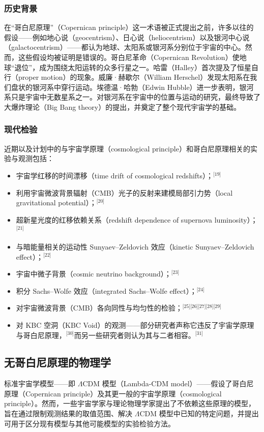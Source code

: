 \subsubsection{历史背景}
在“哥白尼原理”（Copernican principle）这一术语被正式提出之前，许多以往的假设——例如地心说（geocentrism）、日心说（heliocentrism）以及银河中心说（galactocentrism）——都认为地球、太阳系或银河系分别位于宇宙的中心。然而，这些假设均被证明是错误的。哥白尼革命（Copernican Revolution）使地球“退位”，成为围绕太阳运转的众多行星之一。哈雷（Halley）首次提及了恒星自行（proper motion）的现象。威廉·赫歇尔（William Herschel）发现太阳系在我们盘状的银河系中穿行运动。埃德温·哈勃（Edwin Hubble）进一步表明，银河系只是宇宙中无数星系之一。对银河系在宇宙中的位置与运动的研究，最终导致了大爆炸理论（Big Bang theory）的提出，并奠定了整个现代宇宙学的基础。
\subsubsection{现代检验}
近期以及计划中的与宇宙学原理（cosmological principle）和哥白尼原理相关的实验与观测包括：
\begin{itemize}
    \item 宇宙学红移的时间漂移（time drift of cosmological redshifts）；\(^\text{[19]}\)
    \item 利用宇宙微波背景辐射（CMB）光子的反射来建模局部引力势（local gravitational potential）；\(^\text{[20]}\)
    \item 超新星光度的红移依赖关系（redshift dependence of supernova luminosity）；\(^\text{[21]}\)
    \item 与暗能量相关的运动性 Sunyaev–Zeldovich 效应（kinetic Sunyaev–Zeldovich effect）；\(^\text{[22]}\)
    \item 宇宙中微子背景（cosmic neutrino background）；\(^\text{[23]}\)
    \item 积分 Sachs–Wolfe 效应（integrated Sachs–Wolfe effect）；\(^\text{[24]}\)
    \item 对宇宙微波背景（CMB）各向同性与均匀性的检验；\(^\text{[25][26][27][28][29]}\)
    \item 对 KBC 空洞（KBC Void）的观测——部分研究者声称它违反了宇宙学原理与哥白尼原理，\(^\text{[30]}\)而另一些研究者则认为其与二者相容。\(^\text{[31]}\)
\end{itemize}
\subsection{无哥白尼原理的物理学}
标准宇宙学模型——即 $\Lambda$CDM 模型（Lambda-CDM model）——假设了哥白尼原理（Copernican principle）及其更一般的宇宙学原理（cosmological principle）。然而，一些宇宙学家与理论物理学家提出了不依赖这些原理的模型，旨在通过限制观测结果的取值范围、解决 $\Lambda$CDM 模型中已知的特定问题，并提出可用于区分现有模型与其他可能模型的实验检验方法。

